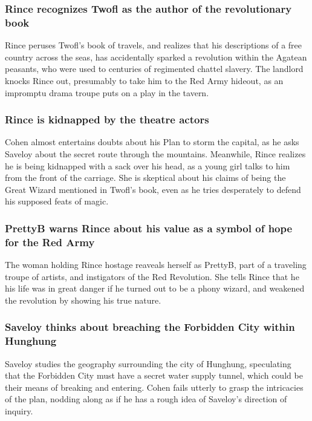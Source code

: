 \subsubsection{\Gls{Rince} recognizes \Gls{Twofl} as the author of the revolutionary book}
\Gls{Rince} peruses \Gls{Twofl}'s book of travels, and realizes that his descriptions of a free
country across the seas, has accidentally sparked a revolution within the Agatean peasants, who were
used to centuries of regimented chattel slavery. The landlord knocks \Gls{Rince} out, presumably to
take him to the Red Army hideout, as an impromptu drama troupe puts on a play in the tavern.

\subsubsection{\Gls{Rince} is kidnapped by the theatre actors}
\Gls{Cohen} almost entertains doubts about his Plan to storm the capital, as he asks \Gls{Saveloy}
about the secret route through the mountains. Meanwhile, \Gls{Rince} realizes he is being kidnapped
with a sack over his head, as a young girl talks to him from the front of the carriage. She is
skeptical about his claims of being the Great Wizard mentioned in \Gls{Twofl}'s book, even as he
tries desperately to defend his supposed feats of magic.

\subsubsection{\Gls{PrettyB} warns \Gls{Rince} about his value as a symbol of hope for the Red Army}
The woman holding \Gls{Rince} hostage reaveals herself as \Gls{PrettyB}, part of a traveling
troupe of artists, and instigators of the Red Revolution. She tells \Gls{Rince} that he his life was
in great danger if he turned out to be a phony wizard, and weakened the revolution by showing his
true nature.

\subsubsection{\Gls{Saveloy} thinks about breaching the Forbidden City within Hunghung}
\Gls{Saveloy} studies the geography surrounding the city of Hunghung, speculating that the Forbidden
City must have a secret water supply tunnel, which could be their means of breaking and entering.
\Gls{Cohen} fails utterly to grasp the intricacies of the plan, nodding along as if he has a rough
idea of \Gls{Saveloy}'s direction of inquiry.

